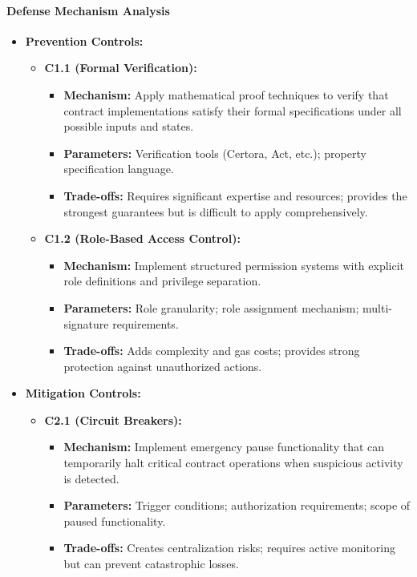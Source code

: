 \paragraph{Defense Mechanism Analysis}

\begin{itemize}
\item \textbf{Prevention Controls:}
    \begin{itemize}
    \item \textbf{C1.1 (Formal Verification):}
        \begin{itemize}
        \item \textbf{Mechanism:} Apply mathematical proof techniques to verify that contract implementations satisfy their formal specifications under all possible inputs and states.
        \item \textbf{Parameters:} Verification tools (Certora, Act, etc.); property specification language.
        \item \textbf{Trade-offs:} Requires significant expertise and resources; provides the strongest guarantees but is difficult to apply comprehensively.
        \end{itemize}
    
    \item \textbf{C1.2 (Role-Based Access Control):}
        \begin{itemize}
        \item \textbf{Mechanism:} Implement structured permission systems with explicit role definitions and privilege separation.
        \item \textbf{Parameters:} Role granularity; role assignment mechanism; multi-signature requirements.
        \item \textbf{Trade-offs:} Adds complexity and gas costs; provides strong protection against unauthorized actions.
        \end{itemize}
    \end{itemize}

\item \textbf{Mitigation Controls:}
    \begin{itemize}
    \item \textbf{C2.1 (Circuit Breakers):}
        \begin{itemize}
        \item \textbf{Mechanism:} Implement emergency pause functionality that can temporarily halt critical contract operations when suspicious activity is detected.
        \item \textbf{Parameters:} Trigger conditions; authorization requirements; scope of paused functionality.
        \item \textbf{Trade-offs:} Creates centralization risks; requires active monitoring but can prevent catastrophic losses.
        \end{itemize}
    

\end{itemize}
\end{itemize}
